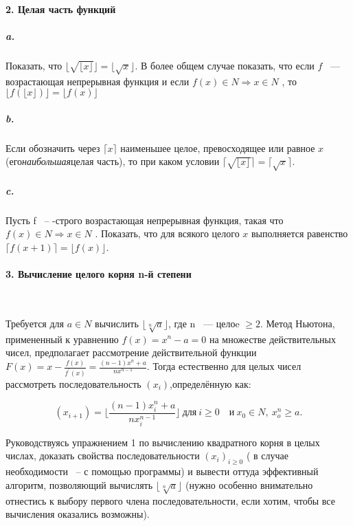 \newpage



\paragraph { 2. Целая часть функций}

\subparagraph { a.} Показать, что $\lfloor\sqrt{\lfloor {x }\rfloor}\rfloor=
\lfloor\sqrt{x}\rfloor$. В более общем случае показать, что если $f$ ~--- возрастающая непрерывная функция и если $f\left(x\right)\in{ N }\Rightarrow {x\in {N}}$ , то $\lfloor {f\left(\lfloor {x}\rfloor\right)}\rfloor=\lfloor{ f\left({x}\right)}\rfloor$

\subparagraph { b.} Если обозначить через $\lceil{x}\rceil$ наименьшее целое, превосходящее или равное $x$ (его{\it наибольшая}целая часть), то при каком условии $\lceil{\sqrt{\lfloor {x}\rfloor}}\rceil=\lceil{\sqrt{x}}\rceil$.

\subparagraph { c.} Пусть f ~-- -строго возрастающая непрерывная функция, такая что $f\left(x\right)\in{ N }\Rightarrow {x\in {N}}$ . Показать, что для всякого целого $x$ выполняется равенство $\lceil{f\left({x+1}\right)}\rceil=\lfloor{f\left({x}\right)}\rfloor$. 

\paragraph { 3. Вычисление целого корня n-й степени}\ \newline

Требуется для $a\in{N}$ вычислить $\lfloor{\sqrt[n]{a}}\rfloor$, где n ~--- целоe $ \geqslant{2}$. Метод Ньютона, примененный к уравнению $f\left({x}\right)=x^{n}-a=0$ на множестве действительных чисел, предполагает рассмотрение действительной функции $F\left({x}\right)=x-\frac{f\left({x}\right)}{f^\prime\left({x}\right)}= \frac{\left({n-1}\right)x^{n}+a}{nx^{n-1}}$. Тогда естественно для целых чисел рассмотреть последовательность $\left({x_{i}}\right)$,определённую как:

\begin{equation*}
\left({x_{i+1}}\right)=\lfloor\frac{\left({n-1}\right)x_i^n+a}{nx_i^{n-1}}\rfloor ~\text{для}~ i\geqslant{0}\quad\text{и}~ x_{0}\in{N}, ~x_o^n\geqslant{a}.
\end{equation*}

Руководствуясь упражнением 1 по вычислению квадратного корня в целых числах, доказать свойства последовательности $\left({x_{i}}\right)_{i\geqslant{0}}$ ( в случае необходимости ~-- с помощью программы) и вывести оттуда эффективный алгоритм, позволяющий вычислять $\lfloor\sqrt[n]{a}\rfloor$ (нужно особенно внимательно отнестись к выбору первого члена последовательности, если хотим, чтобы все вычисления оказались возможны). 

